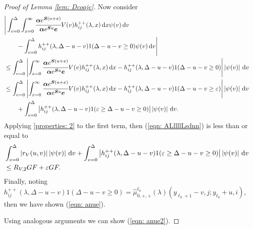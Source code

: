 \begin{proof}[Proof of Lemma \ref{lem: Dcoajc}]
                Now consider 
                \begin{align}
                	&\Bigg|\int_{v=0}^\Delta \int_{x=0}^\infty \cfrac{\boldsymbol \alpha e^{\boldsymbol{S}(u+x)} }{\boldsymbol \alpha e^{\boldsymbol{S}u} \boldsymbol e} V(v)h_{ij}^{++} (\lambda,x)\, \mathrm{d} x \psi(v)\, \mathrm{d} v  \nonumber 
		\\&\qquad{}- \int_{v=0}^\Delta h_{ij}^{++}(\lambda,\Delta-u-v) 1(\Delta-u-v\geq 0) \psi(v)\, \mathrm{d} v\Bigg| \nonumber 
                	\\&\leq \int_{v=0}^\Delta \left|  \int_{x=0}^\infty \cfrac{\boldsymbol \alpha e^{\boldsymbol{S}(u+x)} }{\boldsymbol \alpha e^{\boldsymbol{S}u} \boldsymbol e} V(v)h_{ij}^{++} (\lambda,x)\, \mathrm{d} x  - h_{ij}^{++}(\lambda,\Delta-u-v) 1(\Delta-u-v\geq 0) \right| \left| \psi(v) \right| \, \mathrm{d} v\nonumber 
                	\\&\leq \int_{v=0}^\Delta \left|  \int_{x=0}^\infty \cfrac{\boldsymbol \alpha e^{\boldsymbol{S}(u+x)} }{\boldsymbol \alpha e^{\boldsymbol{S}u} \boldsymbol e} V(v)h_{ij}^{++} (\lambda,x)\, \mathrm{d} x  - h_{ij}^{++}(\lambda,\Delta-u-v) 1(\Delta-u-v\geq \varepsilon) \right| \left| \psi(v) \right| \, \mathrm{d} v\nonumber 
                	\\&\qquad {}+ \int_{v=0}^\Delta \left| h_{ij}^{++}(\lambda,\Delta-u-v) 1(\varepsilon \geq \Delta-u-v\geq 0) \right| \left| \psi(v) \right| \, \mathrm{d} v. \label{eqn: ALllllLsdnn}
                \end{align}
                Applying \ref{properties: 2} to the first term, then (\ref{eqn: ALllllLsdnn}) is less than or equal to 
                \begin{align}
                	& \int_{v=0}^\Delta |r_V(u,v)| \left| \psi(v) \right| \, \mathrm{d} v 
                	+ \int_{v=0}^\Delta \left| h_{ij}^{++}(\lambda,\Delta-u-v) 1(\varepsilon \geq \Delta-u-v\geq 0) \right| \left| \psi(v) \right| \, \mathrm{d} v\nonumber 
                	\\&\leq R_{V,2} GF + \varepsilon GF. \nonumber 
                \end{align}
                Finally, noting \(h_{ij}^{++}(\lambda,\Delta-u-v) 1(\Delta-u-v\geq 0)=\widehat \mu_{0,+,+}^{\ell_0}(\lambda)(y_{\ell_0+1}-v,j;y_{\ell_0}+u,i)\), then we have shown (\ref{eqn: anue}). 
                
                Using analogous arguments we can show  (\ref{eqn: anue2}).
\end{proof}

